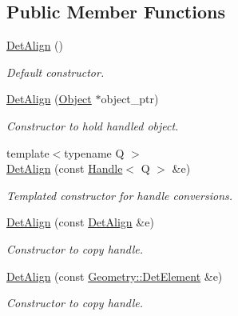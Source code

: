 \subsection*{Public Member Functions}
\begin{DoxyCompactItemize}
\item 
\hyperlink{class_d_d4hep_1_1_alignments_1_1_det_align_a32f656225a62fa9b6b789464bfea22b3}{DetAlign} ()
\begin{DoxyCompactList}\small\item\em Default constructor. \item\end{DoxyCompactList}\item 
\hyperlink{class_d_d4hep_1_1_alignments_1_1_det_align_a8b7b85c54d99bcc7e3f0535a4833780e}{DetAlign} (\hyperlink{class_d_d4hep_1_1_geometry_1_1_det_element_object}{Object} $\ast$object\_\-ptr)
\begin{DoxyCompactList}\small\item\em Constructor to hold handled object. \item\end{DoxyCompactList}\item 
{\footnotesize template$<$typename Q $>$ }\\\hyperlink{class_d_d4hep_1_1_alignments_1_1_det_align_ae706f406dd358f2d1a717852f87cdcc1}{DetAlign} (const \hyperlink{class_d_d4hep_1_1_handle}{Handle}$<$ Q $>$ \&e)
\begin{DoxyCompactList}\small\item\em Templated constructor for handle conversions. \item\end{DoxyCompactList}\item 
\hyperlink{class_d_d4hep_1_1_alignments_1_1_det_align_ac322b60733704c92ed78a405f4c2b997}{DetAlign} (const \hyperlink{class_d_d4hep_1_1_alignments_1_1_det_align}{DetAlign} \&e)
\begin{DoxyCompactList}\small\item\em Constructor to copy handle. \item\end{DoxyCompactList}\item 
\hyperlink{class_d_d4hep_1_1_alignments_1_1_det_align_acb573b6c89a9e18bc272e8b1f2db3ea3}{DetAlign} (const \hyperlink{class_d_d4hep_1_1_geometry_1_1_det_element}{Geometry::DetElement} \&e)
\begin{DoxyCompactList}\small\item\em Constructor to copy handle. \item\end{DoxyCompactList}\item 

\end{DoxyCompactItemize}
